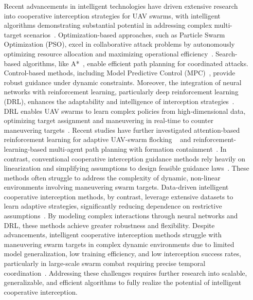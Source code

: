 \documentclass[lettersize,journal]{IEEEtran}
\newcommand{\hladd}[1]{{\color{blue}#1}}
\begin{document}
Recent advancements in intelligent technologies have driven extensive research into cooperative
interception strategies for UAV swarms, with intelligent algorithms demonstrating substantial
potential in addressing complex multi-target scenarios~\cite{chen2024enhanced,wu2020collaborative}.
Optimization-based approaches, such as Particle Swarm Optimization (PSO), excel in
collaborative attack problems by autonomously optimizing resource allocation and maximizing
operational efficiency~\cite{zhao2024hierarchical,wu2020collaborative}.
Search-based algorithms, like A*~\cite{liao2024research}, enable efficient path planning for
coordinated attacks.
Control-based methods, including Model Predictive Control
(MPC)~\cite{kim2024adaptive}, provide robust guidance under dynamic constraints.
Moreover, the integration of neural networks with reinforcement learning, particularly deep
reinforcement learning (DRL), enhances the adaptability and intelligence of interception
strategies~\cite{luo2022uav,zhan2022multiple,wang2021uav}.
DRL enables UAV swarms to learn complex policies from high-dimensional data, optimizing target
assignment and maneuvering in real-time to counter maneuvering targets~\cite{sun2024memory}.
\hladd{Recent studies have further investigated attention-based
reinforcement learning for adaptive UAV-swarm flocking
~\cite{mu2026attention} and reinforcement-learning-based multi-agent path
planning with formation containment~\cite{li2026path}.}
In contrast, conventional cooperative interception guidance methods rely heavily on
linearization and simplifying assumptions to design feasible guidance laws~\cite{zhao2025global}.
These methods often struggle to address the complexity of dynamic, non-linear environments
involving maneuvering swarm targets.
Data-driven intelligent cooperative interception methods, by contrast, leverage extensive
datasets to learn adaptive strategies, significantly reducing dependence on restrictive
assumptions~\cite{fainkich2025cooperative}.
By modeling complex interactions through neural networks and DRL, these methods achieve greater
robustness and flexibility.
Despite advancements, intelligent cooperative interception methods struggle with maneuvering
swarm targets in complex dynamic environments due to limited model generalization, low training
efficiency, and low interception success rates, particularly in large-scale swarm combat
requiring precise temporal coordination~\cite{horyna2023decentralized}.
Addressing these challenges requires further research into scalable, generalizable, and
efficient algorithms to fully realize the potential of intelligent cooperative interception.
\end{document}
